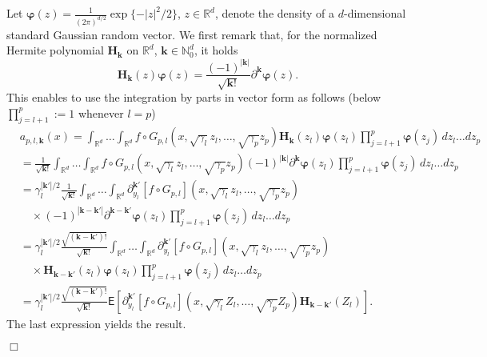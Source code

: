 \documentclass[aap,preprint]{imsart}
\newcommand{\proofendsign}{$\Box$}
\newenvironment{proof}{{\noindent \bf Proof }}
 {{\hspace*{\fill}\proofendsign\par\bigskip}}
\begin{document}
\begin{proof}
Let $\boldsymbol{\varphi}(z)=\frac{1}{(2\pi)^{d/2}} \exp\{-|z|^2/2\}$,
$z\in\mathbb R^d$, denote the density of a $d$-dimensional
standard Gaussian random vector.
We first remark that, for the normalized Hermite polynomial $\mathbf H_{\mathbf k}$ on $\mathbb R^d$,
$\mathbf k\in\mathbb N_0^d$, it holds
$$
\mathbf{H}_{\mathbf{k}}(z)\boldsymbol{\varphi}(z)
=\frac{(-1)^{|\mathbf{k}|}}{\sqrt{\mathbf{k} !}} \partial^{\mathbf{k}} \boldsymbol{\varphi}(z).
$$
This enables to use the integration by parts in vector form as follows
(below $\prod_{j=l+1}^p:=1$ whenever $l=p$)
\begin{align*}
&a_{p,l,\mathbf k}(x)
 =
\int_{\mathbb R^d}\ldots\int_{\mathbb R^d}
f\circ G_{p,l}(x,\sqrt{\gamma_{l}}z_{l},\ldots,\sqrt{\gamma_{p}}z_{p})
\mathbf{H}_{\mathbf{k}}(z_{l})\boldsymbol{\varphi}(z_l)
\prod_{j=l+1}^p\boldsymbol{\varphi}(z_j)\, dz_{l}\ldots dz_{p}
\\
& =
\frac{1}{\sqrt{\mathbf k!}}
\int_{\mathbb R^d}\ldots\int_{\mathbb R^d}
f\circ G_{p,l}(x,\sqrt{\gamma_{l}}z_{l},\ldots,\sqrt{\gamma_{p}}z_{p})
(-1)^{|\mathbf{k}|}\partial^{\mathbf{k}} \boldsymbol{\varphi}(z_l)
\prod_{j=l+1}^p\boldsymbol{\varphi}(z_j)\, dz_{l}\ldots dz_{p}
\\
& =
\gamma_l^{|\mathbf k'|/2}\frac{1}{\sqrt{\mathbf k!}}
\int_{\mathbb R^d}\ldots\int_{\mathbb R^d}
\partial_{y_l}^{\mathbf k'}[f\circ G_{p,l}](x,\sqrt{\gamma_{l}}z_{l},\ldots,\sqrt{\gamma_{p}}z_{p})
\\
&\hspace{1em}\times
(-1)^{|\mathbf{k}-\mathbf k'|}\partial^{\mathbf{k}-\mathbf k'} \boldsymbol{\varphi}(z_l)
\prod_{j=l+1}^p\boldsymbol{\varphi}(z_j)\, dz_{l}\ldots dz_{p}
\\
& =
\gamma_l^{|\mathbf k'|/2}\frac{\sqrt{(\mathbf k-\mathbf k')!}}{\sqrt{\mathbf k!}}
\int_{\mathbb R^d}\ldots\int_{\mathbb R^d}
\partial_{y_l}^{\mathbf k'}[f\circ G_{p,l}](x,\sqrt{\gamma_{l}}z_{l},\ldots,\sqrt{\gamma_{p}}z_{p})
\\
&\hspace{1em}\times
\mathbf{H}_{\mathbf{k}-\mathbf k'}(z_{l})\boldsymbol{\varphi}(z_l)
\prod_{j=l+1}^p\boldsymbol{\varphi}(z_j)\, dz_{l}\ldots dz_{p}
\\
 & =\gamma_{l}^{|\mathbf{k}'|/2}\frac{\sqrt{(\mathbf{k}-\mathbf{k}')!}}{\sqrt{\mathbf{k}!}}\mathsf{E}\left[\partial_{y_{l}}^{\mathbf{k}'}[f\circ G_{p,l}](x,\sqrt{\gamma_{l}}Z_{l},\ldots,\sqrt{\gamma_{p}}Z_{p})\mathbf{H}_{\mathbf{k}-\mathbf{k}'}(Z_{l})\right].
\end{align*}
The last expression yields the result.
\end{proof}
\end{document}
